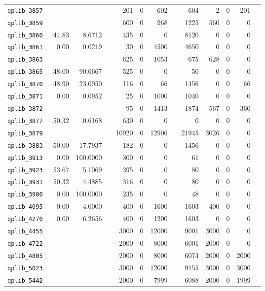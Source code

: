 \begin{longtable}{lrrrrrrrrrrrr}
{\tt 	qplib\_3857	}	&		&		&	&	201	&	0	&	602	&	&	604	&	2	&	0	&	201	\\
{\tt 	qplib\_3859	}	&		&		&	&	600	&	0	&	968	&	&	1225	&	560	&	0	&	0	\\
{\tt 	qplib\_3860	}	&	44.83	&	8.6712	&	&	435	&	0	&	0	&	&	8120	&	0	&	0	&	0	\\
{\tt 	qplib\_3861	}	&	0.00	&	0.0219	&	&	30	&	0	&	4500	&	&	4650	&	0	&	0	&	0	\\
{\tt 	qplib\_3863	}	&		&		&	&	625	&	0	&	1053	&	&	675	&	628	&	0	&	0	\\
{\tt 	qplib\_3865	}	&	48.00	&	90.6667	&	&	525	&	0	&	0	&	&	50	&	0	&	0	&	0	\\
{\tt 	qplib\_3870	}	&	48.90	&	23.0950	&	&	116	&	0	&	66	&	&	1456	&	0	&	0	&	66	\\
{\tt 	qplib\_3871	}	&	0.00	&	0.0952	&	&	25	&	0	&	1000	&	&	1040	&	0	&	0	&	0	\\
{\tt 	qplib\_3872	}	&		&		&	&	95	&	0	&	1413	&	&	1874	&	567	&	0	&	360	\\
{\tt 	qplib\_3877	}	&	50.32	&	0.6168	&	&	630	&	0	&	0	&	&	0	&	0	&	0	&	0	\\
{\tt 	qplib\_3879	}	&		&		&	&	10920	&	0	&	12906	&	&	21945	&	3026	&	0	&	0	\\
{\tt 	qplib\_3883	}	&	50.00	&	17.7937	&	&	182	&	0	&	0	&	&	1456	&	0	&	0	&	0	\\
{\tt 	qplib\_3913	}	&	0.00	&	100.0000	&	&	300	&	0	&	0	&	&	61	&	0	&	0	&	0	\\
{\tt 	qplib\_3923	}	&	53.67	&	5.1069	&	&	395	&	0	&	0	&	&	80	&	0	&	0	&	0	\\
{\tt 	qplib\_3931	}	&	50.32	&	4.4885	&	&	316	&	0	&	0	&	&	80	&	0	&	0	&	0	\\
{\tt 	qplib\_3980	}	&	0.00	&	100.0000	&	&	235	&	0	&	0	&	&	48	&	0	&	0	&	0	\\
{\tt 	qplib\_4095	}	&	0.00	&	4.0000	&	&	400	&	0	&	1600	&	&	1603	&	400	&	0	&	0	\\
{\tt 	qplib\_4270	}	&	0.00	&	6.2656	&	&	400	&	0	&	1200	&	&	1603	&	0	&	0	&	0	\\
{\tt 	qplib\_4455	}	&		&		&	&	3000	&	0	&	12000	&	&	9001	&	3000	&	0	&	0	\\
{\tt 	qplib\_4722	}	&		&		&	&	2000	&	0	&	8000	&	&	6001	&	2000	&	0	&	0	\\
{\tt 	qplib\_4805	}	&		&		&	&	2000	&	0	&	8000	&	&	6074	&	2000	&	0	&	2000	\\
{\tt 	qplib\_5023	}	&		&		&	&	3000	&	0	&	12000	&	&	9155	&	3000	&	0	&	3000	\\
{\tt 	qplib\_5442	}	&		&		&	&	2000	&	0	&	7999	&	&	6088	&	2000	&	0	&	1999	\\

\end{longtable}
